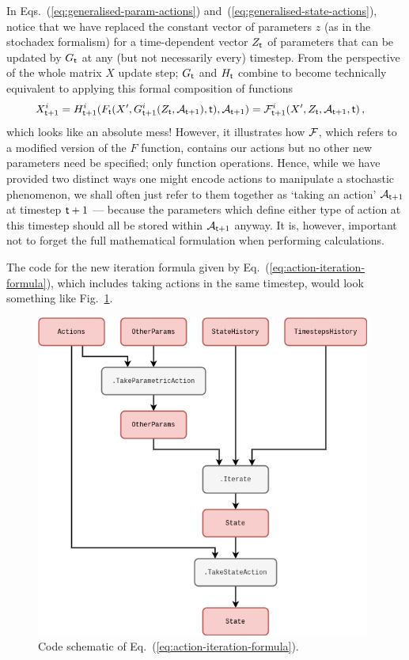 In Eqs.~(\ref{eq:generalised-param-actions}) and~(\ref{eq:generalised-state-actions}), notice that we have replaced the constant vector of parameters $z$ (as in the stochadex formalism) for a time-dependent vector $Z_{{\sf t}}$ of parameters that can be updated by $G_{\sf t}$ at any (but not necessarily every) timestep. From the perspective of the whole matrix $X$ update step; $G_{\sf t}$ and $H_{\sf t}$ combine to become technically equivalent to applying this formal composition of functions
\begin{align}
X^i_{{\sf t}+1} &= H^i_{{\sf t}+1}(F_{\sf t}(X', G_{{\sf t}+1}^i(Z_{{\sf t}}, {\cal A}_{{\sf t}+1}), {\sf t}), {\cal A}_{{\sf t}+1}) = {\cal F}^i_{{\sf t}+1}(X', Z_{{\sf t}}, {\cal A}_{{\sf t}+1}, {\sf t}) \label{eq:action-iteration-formula}\,,
\end{align}
which looks like an absolute mess! However, it illustrates how ${\cal F}$, which refers to a modified version of the $F$ function, contains our actions but no other new parameters need be specified; only function operations. Hence, while we have provided two distinct ways one might encode actions to manipulate a stochastic phenomenon, we shall often just refer to them together as `taking an action' ${\cal A}_{{\sf t}+1}$ at timestep ${\sf t}+1$ --- because the parameters which define either type of action at this timestep should all be stored within ${\cal A}_{{\sf t}+1}$ anyway. It is, however, important not to forget the full mathematical formulation when performing calculations. 

The code for the new iteration formula given by Eq.~(\ref{eq:action-iteration-formula}), which includes taking actions in the same timestep, would look something like Fig.~\ref{fig:iterations-with-actions}.

\begin{figure}[h]
\centering
\includegraphics[width=11cm]{images/chapter-9-iterations-with-actions.drawio.png}
\caption{Code schematic of Eq.~(\ref{eq:action-iteration-formula}).}
\label{fig:iterations-with-actions}
\end{figure}

